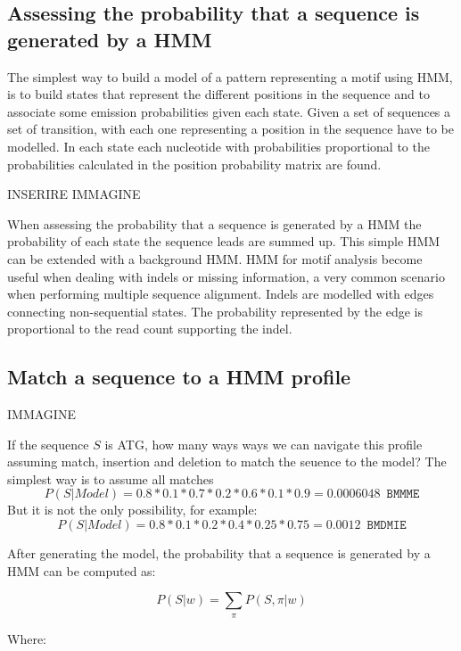 		\subsection{Assessing the probability that a sequence is generated by a HMM}
		The simplest way to build a model of a pattern representing a motif using HMM, is to build states that represent the different positions in the sequence and to associate some emission probabilities given each state.
		Given a set of sequences a set of transition, with each one representing a position in the sequence have to be modelled.
		In each state each nucleotide with probabilities proportional to the probabilities calculated in the position probability matrix are found.

		\begin{center}
			INSERIRE IMMAGINE
		\end{center}

		When assessing the probability that a sequence is generated by a HMM the probability of each state the sequence leads are summed up.
		This simple HMM can be extended with a background HMM.
		HMM for motif analysis become useful when dealing with indels or missing information, a very common scenario when performing multiple sequence alignment.
		Indels are modelled with edges connecting non-sequential states.
		The probability represented by the edge is proportional to the read count supporting the indel.

		\subsection{Match a sequence to a HMM profile}

		\begin{center}
			IMMAGINE
		\end{center}

		If the sequence $S$ is ATG, how many ways ways we can navigate this profile assuming match, insertion and deletion to match the seuence to the model?
		The simplest way is to assume all matches
		$$P(S|Model) = 0.8*0.1*0.7*0.2*0.6*0.1*0.9 = 0.0006048 \,\,\, \texttt{BMMME}$$
		But it is not the only possibility, for example:
		$$P(S|Model) = 0.8*0.1*0.2*0.4*0.25*0.75 = 0.0012 \,\,\, \texttt{BMDMIE}$$

				After generating the model, the probability that a sequence is generated by a HMM can be computed as:

		$$P(S|w) = \sum\limits_\pi P(S, \pi |w)$$

		Where:

